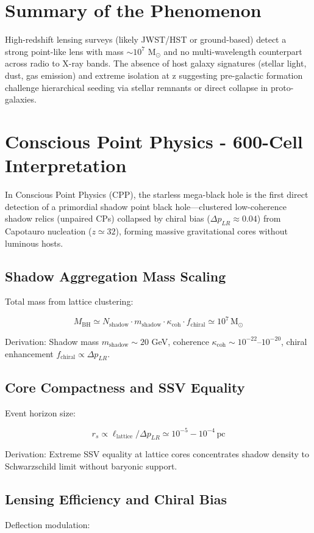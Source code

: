 \documentclass[11pt]{article}
\begin{document}
\section{Summary of the Phenomenon}
High-redshift lensing surveys (likely JWST/HST or ground-based) detect a strong point-like lens with mass $\sim 10^7$ M$_\odot$ and no multi-wavelength counterpart across radio to X-ray bands. The absence of host galaxy signatures (stellar light, dust, gas emission) and extreme isolation at z suggesting pre-galactic formation challenge hierarchical seeding via stellar remnants or direct collapse in proto-galaxies.

\section{Conscious Point Physics - 600-Cell Interpretation}
In Conscious Point Physics (CPP), the starless mega-black hole is the first direct detection of a primordial shadow point black hole—clustered low-coherence shadow relics (unpaired CPs) collapsed by chiral bias ($\Delta p_{LR} \approx 0.04$) from Capotauro nucleation ($z \simeq 32$), forming massive gravitational cores without luminous hosts.

\subsection{Shadow Aggregation Mass Scaling}
Total mass from lattice clustering:

\[
M_{\text{BH}} \simeq N_{\text{shadow}} \cdot m_{\text{shadow}} \cdot \kappa_{\text{coh}} \cdot f_{\text{chiral}} \simeq 10^7 \, \text{M}_\odot
\]

Derivation: Shadow mass $m_{\text{shadow}} \sim 20$ GeV, coherence $\kappa_{\text{coh}} \sim 10^{-22}$--$10^{-20}$, chiral enhancement $f_{\text{chiral}} \propto \Delta p_{LR}$.

\subsection{Core Compactness and SSV Equality}
Event horizon size:

\[
r_s \propto \ell_{\text{lattice}} / \Delta p_{LR} \simeq 10^{-5} - 10^{-4} \, \text{pc}
\]

Derivation: Extreme SSV equality at lattice cores concentrates shadow density to Schwarzschild limit without baryonic support.

\subsection{Lensing Efficiency and Chiral Bias}
Deflection modulation:
\end{document}
